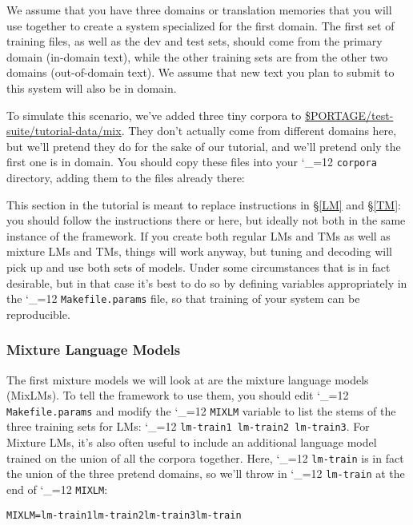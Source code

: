\documentclass[11pt,letterpaper]{article}
\def\code{\begingroup\catcode`\_=12 \codex}
\newcommand{\codex}[1]{\texttt{#1}\endgroup}
\begin{document}
We assume that you have three domains or translation memories that you will use
together to create a system specialized for the first domain.  The first set of
training files, as well as the dev and test sets, should come from the primary
domain (in-domain text), while the other training sets are from the other two
domains (out-of-domain text).  We assume that new text you plan to submit to
this system will also be in domain.

To simulate this scenario, we've added three tiny corpora to
\url{$PORTAGE/test-suite/tutorial-data/mix}.
They don't actually come from different domains here, but we'll pretend they do
for the sake of our tutorial, and we'll pretend only the first one is in
domain.  You should copy these files into your \code{corpora} directory, adding
them to the files already there:

This section in the tutorial is meant to replace instructions in \S\ref{LM} and
\S\ref{TM}: you should follow the instructions there or here, but ideally not
both in the same instance of the framework.  If you create both regular LMs and
TMs as well as mixture LMs and TMs, things will work anyway, but tuning and
decoding will pick up and use both sets of models.  Under some circumstances
that is in fact desirable, but in that case it's best to do so by defining
variables appropriately in the \code{Makefile.params} file, so that training of
your system can be reproducible.

\subsubsection{Mixture Language Models} \label{MIXLM}

The first mixture models we will look at are the mixture language models
(MixLMs).  To tell the framework to use them, you should edit
\code{Makefile.params} and modify the \code{MIXLM} variable to list the stems
of the three training sets for LMs: \code{lm-train1 lm-train2 lm-train3}.  For
Mixture LMs, it's also often useful to include an additional language model
trained on the union of all the corpora together.  Here, \code{lm-train} is
in fact the union of the three pretend domains, so we'll throw in
\code{lm-train} at the end of \code{MIXLM}:
\begin{small}
\begin{alltt}
   MIXLM = lm-train1 lm-train2 lm-train3 lm-train
\end{alltt}
\end{small}
\end{document}
